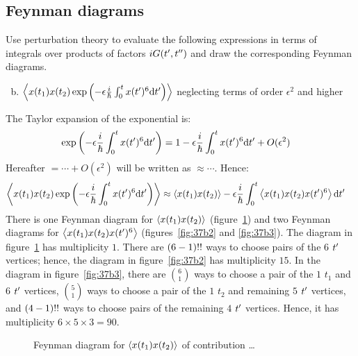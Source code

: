 \subsection{Feynman diagrams}

Use perturbation theory to evaluate the following expressions in terms of
integrals over products of factors $iG({t^{\prime}}, {t^{\prime\prime}})$ and draw the corresponding
Feynman diagrams.

\begin{enumerate}[(a)]
  \setcounter{enumi}{1}
  \item $\left\langle{x(t_1) x(t_2) \exp\left(-\epsilon\frac{i}{\hbar}\int_0^t x({t^{\prime}})^6 \text{d}{}{{t^{\prime}}}\right)}\right\rangle$
        neglecting terms of order $\epsilon^2$ and higher
\end{enumerate}

The Taylor expansion of the exponential is:
\begin{align*}
  \exp\left(-\epsilon\frac{i}{\hbar}\int_0^t x({t^{\prime}})^6 \text{d}{}{{t^{\prime}}} \right)
   & =
  1 - \epsilon\frac{i}{\hbar}\int_0^t x({t^{\prime}})^6 \text{d}{}{{t^{\prime}}} + O(\epsilon^2)
\end{align*}
Hereafter $=\cdots + O(\epsilon^2)$ will be written as $\approx\cdots$.
Hence:
\begin{align*}
  \left\langle{x(t_1) x(t_2) \exp\left(-\epsilon\frac{i}{\hbar}\int_0^t x({t^{\prime}})^6 \text{d}{}{{t^{\prime}}}\right)}\right\rangle
   & \approx
  \left\langle{x(t_1) x(t_2)}\right\rangle - \epsilon\frac{i}{\hbar}\int_0^t \left\langle{x(t_1) x(t_2) x({t^{\prime}})^6}\right\rangle \text{d}{}{{t^{\prime}}}
\end{align*}
There is one Feynman diagram for $\left\langle{x(t_1) x(t_2)}\right\rangle$ (figure~\ref{fig:37b1})
and two Feynman diagrams for $\left\langle{x(t_1) x(t_2) x({t^{\prime}})^6}\right\rangle$
(figures~\ref{fig:37b2} and \ref{fig:37b3}).
The diagram in figure~\ref{fig:37b1} has multiplicity $1$.
There are $(6 - 1){!!}$ ways to choose pairs of the $6$ ${t^{\prime}}$ vertices;
hence, the diagram in figure~\ref{fig:37b2} has multiplicity $15$.
In the diagram in figure~\ref{fig:37b3}, there are $\binom{6}{1}$ ways to
choose a pair of the $1$ $t_1$ and $6$ ${t^{\prime}}$ vertices, $\binom{5}{1}$ ways to
choose a pair of the $1$ $t_2$ and remaining $5$ ${t^{\prime}}$ vertices, and $(4 -
  1){!!}$ ways to choose pairs of the remaining $4$ ${t^{\prime}}$ vertices.
Hence, it has multiplicity $6 \times 5 \times 3 = 90$.

\begin{figure}[ht!]
  \centering
  \caption{Feynman diagram for $\left\langle{x(t_1) x(t_2)}\right\rangle$ of contribution \dots}
  \label{fig:37b1}
\end{figure}

